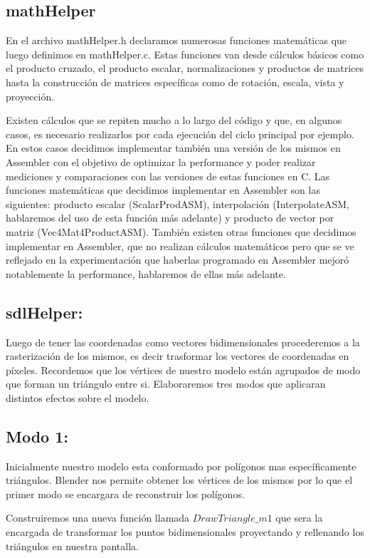 \documentclass[a4paper]{article}
\begin{document}
\subsection{mathHelper}
En el archivo mathHelper.h declaramos numerosas funciones matemáticas que luego definimos en mathHelper.c. Estas funciones van desde cálculos básicos como el producto cruzado, el producto escalar, normalizaciones y productos de matrices hasta la construcción de matrices específicas como de rotación, escala, vista y proyección.
\par Existen cálculos que se repiten mucho a lo largo del código y que, en algunos casos, es necesario realizarlos por cada ejecución del ciclo principal por ejemplo. En estos casos decidimos implementar también una versión de los mismos en Assembler con el objetivo de optimizar la performance y poder realizar mediciones y comparaciones con las versiones de estas funciones en C. Las funciones matemáticas que decidimos implementar en Assembler son las siguientes: producto escalar (ScalarProdASM), interpolación (InterpolateASM, hablaremos del uso de esta función más adelante) y producto de vector por matriz (Vec4Mat4ProductASM). También existen otras funciones que decidimos implementar en Assembler, que no realizan cálculos matemáticos pero que se ve reflejado en la experimentación que haberlas programado en Assembler mejoró notablemente la performance, hablaremos de ellas más adelante.

\subsection{sdlHelper: }



Luego de tener las coordenadas como vectores bidimensionales procederemos a la rasterización de los mismos,  es decir trasformar los vectores de coordenadas en píxeles. Recordemos que los vértices de nuestro modelo están agrupados de  modo que forman un triángulo entre si. Elaboraremos tres modos que aplicaran distintos efectos sobre el modelo. 


\subsection{Modo 1:}



\par Inicialmente nuestro modelo esta conformado por polígonos mas específicamente triángulos. Blender nos permite obtener los vértices de los mismos por lo que el primer modo se encargara de reconstruir los polígonos.
\par Construiremos una nueva función llamada $DrawTriangle\_m1$ que sera la encargada de transformar los puntos bidimensionales proyectando y rellenando los triángulos en nuestra pantalla.
\end{document}
